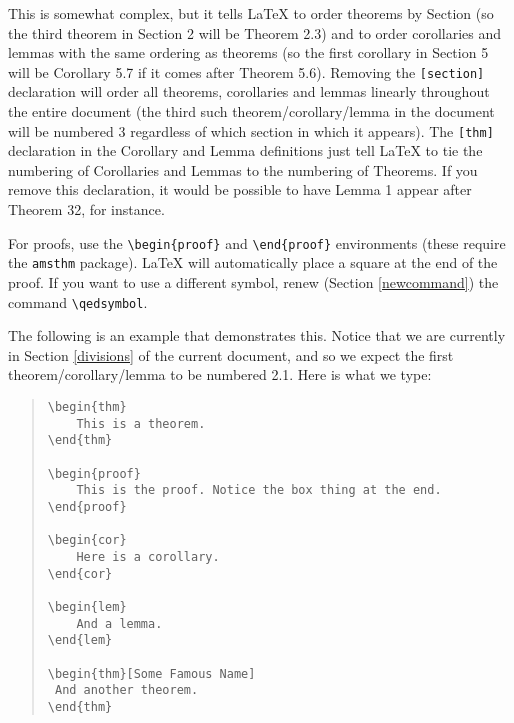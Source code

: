 \documentclass[letterpaper,twoside,10pt]{article}
\newtheorem{thm}{Theorem}[section]
\newtheorem{cor}[thm]{Corollary}
\newtheorem{lem}[thm]{Lemma}
\begin{document}
This is somewhat complex, but it tells {\LaTeX} to order theorems by Section (so the third theorem in Section 2 will be Theorem 2.3) and to order corollaries and lemmas with the same ordering as theorems (so the first corollary in Section 5 will be Corollary 5.7 if it comes after Theorem 5.6). Removing the \texttt{[section]} declaration will order all theorems, corollaries and lemmas linearly throughout the entire document (the third such theorem/corollary/lemma in the document will be numbered 3 regardless of which section in which it appears). The \texttt{[thm]} declaration in the Corollary and Lemma definitions just tell {\LaTeX} to tie the numbering of Corollaries and Lemmas to the numbering of Theorems. If you remove this declaration, it would be possible to have Lemma 1 appear after Theorem 32, for instance.

\bigbreak For proofs, use the \verb!\begin{proof}! and \verb!\end{proof}! environments (these require the \texttt{amsthm} package). {\LaTeX} will automatically place a square at the end of the proof. If you want to use a different symbol, renew (Section \ref{newcommand}) the command \verb!\qedsymbol!.

\newpage
The following is an example that demonstrates this. Notice that we are currently in Section \ref{divisions} of the current document, and so we expect the first theorem/corollary/lemma to be numbered 2.1. Here is what we type:

\begin{quote}
 \begin{verbatim}
\begin{thm}
	This is a theorem.
\end{thm}

\begin{proof}
	This is the proof. Notice the box thing at the end.
\end{proof}

\begin{cor}
	Here is a corollary.
\end{cor}

\begin{lem}
	And a lemma.
\end{lem}

\begin{thm}[Some Famous Name]
 And another theorem.
\end{thm}
 \end{verbatim}
\end{quote}
\end{document}
